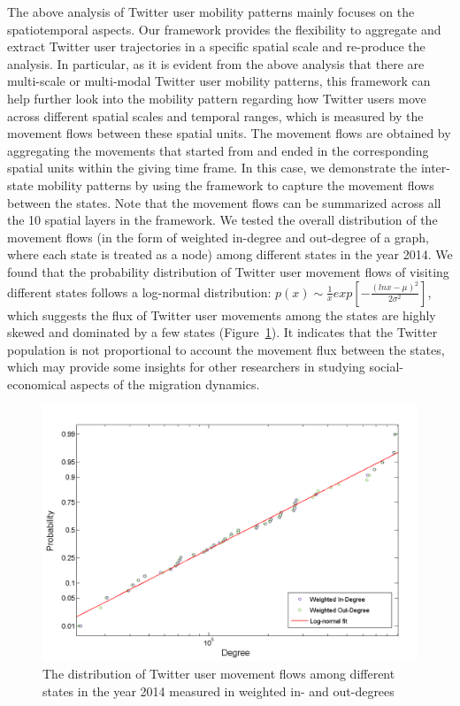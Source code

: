 \documentclass[ijgi,article,accept,moreauthors,pdftex,10pt,a4paper]{mdpi}
\theoremstyle{mdpi}
\newcounter{ex}
\newcounter{re}
\theoremstyle{mdpidefinition}
\begin{document}
The above analysis of Twitter user mobility patterns mainly focuses on the spatiotemporal aspects.
Our framework provides the flexibility to aggregate and extract Twitter user trajectories in a specific spatial scale and re-produce the analysis.
In particular, as it is evident from the above analysis that there are multi-scale or multi-modal Twitter user mobility patterns, this framework can help further look into the mobility pattern regarding how Twitter users move across different spatial scales and temporal ranges, which is measured by the movement flows between these spatial units.
The movement flows are obtained by aggregating the movements that started from and ended in the corresponding spatial units within the giving time frame.
In this case, we demonstrate the inter-state mobility patterns by using the framework to capture the movement flows between the states.
Note that the movement flows can be summarized across all the 10 spatial layers in the framework.
We tested the overall distribution of the movement flows (in the form of weighted in-degree and out-degree of a graph, where each state is treated as a node) among different states in the year 2014.
We found that the probability distribution of Twitter user movement flows of visiting different states follows a log-normal distribution: $p(x)\sim \frac{1}{x}exp[-\frac{(lnx - \mu)^{2}}{2\sigma^{2}}]$, which suggests the flux of Twitter user movements among the states are highly skewed and dominated by a few states (Figure~\ref{fig:state_flow}).
It indicates that the Twitter population is not proportional to account the movement flux between the states, which may provide some insights for other researchers in studying social-economical aspects of the migration dynamics.

\begin{figure}[ht]
\centering
\includegraphics[width=0.8\linewidth]{./figures/degree}
\caption{The distribution of Twitter user movement flows among different states in the year 2014 measured in weighted in- and out-degrees}
\label{fig:state_flow}
\end{figure}
\FloatBarrier
\end{document}
